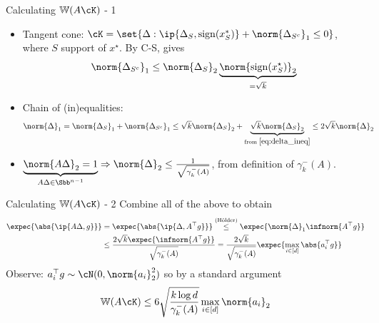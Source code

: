 \documentclass[10pt]{beamer}
\newcommand{\xstar}{x^{\star}}
\begin{document}
\begin{frame}{Calculating $\mathbb{W}(A \cK)$ - 1}
    \begin{itemize}
        \item
        Tangent cone: $\cK = \set{\Delta : \ip{\Delta_S,
        \mathrm{sign}(x^*_S)} + \norm{\Delta_{S^c}}_1 \leq 0}$,
        where $S$ support of $\xstar$. By C-S, gives
        \begin{equation}
            \norm{\Delta_{S^c}}_1 \leq \norm{\Delta_S}_2
            \underbrace{\norm{\mathrm{sign}(\xstar_S)}_2}_{= \sqrt{k}}
            \label{eq:delta_ineq}
        \end{equation}

        \item Chain of (in)equalities:
        \begin{align*}
            \norm{\Delta}_1 &= \norm{\Delta_S}_1 + \norm{\Delta_{S^c}}_1
            \leq \sqrt{k} \norm{\Delta_S}_2 +
            \underbrace{\sqrt{k} \norm{\Delta_{S}}_2}_{
                \text{from } \eqref{eq:delta_ineq}}
            \leq 2 \sqrt{k} \norm{\Delta}_2
        \end{align*}
        \item $\underbrace{\norm{A \Delta}_2 = 1}_{A \Delta \in \Sbb^{n-1}}
        \Rightarrow
            \norm{\Delta}_2 \leq \frac{1}{\sqrt{\gamma_{k}^-(A)}}$,
            from definition of $\gamma_k^-(A)$.
    \end{itemize}
\end{frame}
\begin{frame}{Calculating $\mathbb{W}(A \cK)$ - 2}
    Combine all of the above to obtain
    \begin{align*}
        \expec{\abs{\ip{A \Delta, g}}} &= \expec{\abs{\ip{\Delta, A^\top g}}}
        \overset{(\text{H{\"o}lder})}{\leq}
        \expec{\norm{\Delta}_1
        \infnorm{A^\top g}} \\
        & \leq \frac{2 \sqrt{k} \expec{\infnorm{A^\top g}}}{
        \sqrt{\gamma_k^-(A)}} =
        \frac{2 \sqrt{k}}{\sqrt{\gamma_k^-(A)}}
        \expec{\max_{i \in [d]} \abs{a_i^\top g}}
    \end{align*}
    Observe: $a_i^\top g \sim \cN(0, \norm{a_i}_2^2)$ so by a standard
    argument~\cite[Eq. (3.13)]{LedTal13}
    \[
        \mathbb{W}(A \cK) \leq 6 \sqrt{\frac{k \log d}{\gamma_k^-(A)}}
        \max_{i \in [d]} \norm{a_i}_2
    \]
\end{frame}
\end{document}
